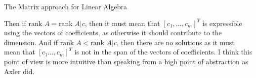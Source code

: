 \begin{entry}[2]{The Matrix approach for Linear Algebra}
\begin{entrysection}
Then if $\text{rank }A = \text{rank }A|c$, then it must mean that $[c_1,\ldots,c_m]^T$ is expressible using the vectors of coefficients, as otherwise it should contribute to the dimension. And if $\text{rank }A < \text{rank }A|c$, then there are no solutions as it must mean that $[c_1\ldots,c_m]^T$ is not in the span of the vectors of coefficients. I think this point of view is more intuitive than speaking from a high point of abstraction as Axler did.
\end{entrysection}

\end{entry}

